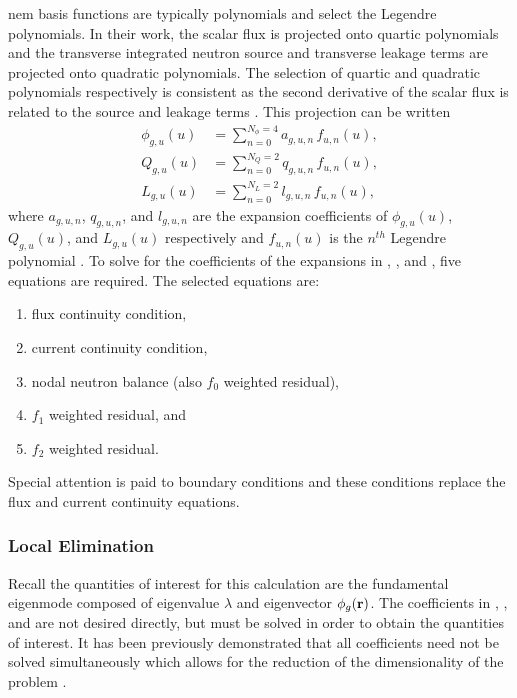     \gls{nem} basis functions are typically polynomials and
    \citeauthor{qe2paper} select the Legendre polynomials. In their work, the
    scalar flux is projected onto quartic polynomials and the transverse
    integrated neutron source and transverse leakage terms are projected onto
    quadratic polynomials. The selection of quartic and quadratic polynomials
    respectively is consistent as the second derivative of the scalar flux is
    related to the source and leakage terms \cite{gehinThesis}. This projection
    can be written
    \begin{align}
      \label{eq:flux_expansion}
      \phi_{g,u}(u) &= \sum_{n=0}^{N_{\phi} = 4} a_{g,u,n} \, f_{u,n}(u), \\
      \label{eq:source_expansion}
      Q_{g,u}(u)    &= \sum_{n=0}^{N_Q = 2}      q_{g,u,n} \, f_{u,n}(u), \\
      \label{eq:leakage_expansion}
      L_{g,u}(u)    &= \sum_{n=0}^{N_L = 2}      l_{g,u,n} \, f_{u,n}(u),
    \end{align}
    where $a_{g,u,n}$, $q_{g,u,n}$, and $l_{g,u,n}$ are the expansion
    coefficients of $\phi_{g,u}(u)$, $Q_{g,u}(u)$, and $L_{g,u}(u)$ respectively
    and $f_{u,n}(u)$ is the $n^{th}$ Legendre polynomial \cite{qe2paper}. To
    solve for the coefficients of the expansions in ,
    , and , five equations
    are required. The selected equations are:
    \begin{enumerate}
      \item flux continuity condition,
      \item current continuity condition,
      \item nodal neutron balance (also $f_0$ weighted residual),
      \item $f_1$ weighted residual, and
      \item $f_2$ weighted residual.
    \end{enumerate}
    Special attention is paid to boundary conditions and these conditions 
    replace the flux and current continuity equations.

    \subsubsection{Local Elimination}
      \label{sec:local_elimination}

      Recall the quantities of interest for this calculation are the fundamental
      eigenmode composed of eigenvalue $\lambda$ and eigenvector $\phi_g(\mathbf{r})$.
      The coefficients in , ,
      and  are not desired directly, but must be
      solved in order to obtain the quantities of interest. It has been
      previously demonstrated that all coefficients need not be solved
      simultaneously which allows for the reduction of the dimensionality of the
      problem \cite{gehinThesis}.

